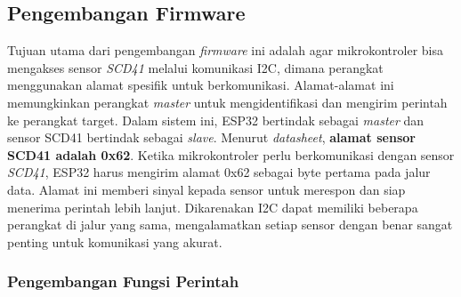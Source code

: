     \subsection{Pengembangan Firmware}
    \label{firmware}
        Tujuan utama dari pengembangan \textit{firmware} ini adalah agar mikrokontroler bisa mengakses sensor \textit{SCD41} melalui komunikasi I2C, dimana perangkat menggunakan alamat spesifik untuk berkomunikasi. Alamat-alamat ini memungkinkan perangkat \textit{master} untuk mengidentifikasi dan mengirim perintah ke perangkat target. Dalam sistem ini, ESP32 bertindak sebagai \textit{master} dan sensor SCD41 bertindak sebagai \textit{slave}. Menurut \textit{datasheet}, \textbf{alamat sensor SCD41 adalah 0x62}. Ketika mikrokontroler perlu berkomunikasi dengan sensor \textit{SCD41}, ESP32 harus mengirim alamat 0x62 sebagai byte pertama pada jalur data. Alamat ini memberi sinyal kepada sensor untuk merespon dan siap menerima perintah lebih lanjut. Dikarenakan I2C dapat memiliki beberapa perangkat di jalur yang sama, mengalamatkan setiap sensor dengan benar sangat penting untuk komunikasi yang akurat.
        
        \subsubsection{Pengembangan Fungsi Perintah}

